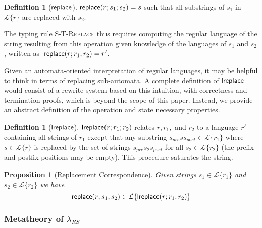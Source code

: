 \documentclass[10pt]{sigplanconf}
\newtheorem{prop}[thm]{Proposition}
\theoremstyle{definition}
\newtheorem{defn}[thm]{Definition}
\newcommand{\Lagr}{\mathcal{L}}
\newcommand{\lang}[1]{\Lagr\{#1\}}
\newcommand{\lambdas}{\lambda_{RS}}
\newcommand{\lsubst}[3]{{\sf replace}(#1;#2;#3)} %
\newcommand{\lreplace}[3]{{\sf lreplace}(#1; #2; #3)}
\begin{document}
\begin{defn}[$\sf{replace}$]
$\lsubst{r}{s_1}{s_2} = s$ such that all substrings of $s_1$ in $\lang{r}$ are replaced with $s_2$.
\end{defn}
The typing rule \textsc{S-T-Replace} thus requires computing the regular language of the string resulting from this operation given knowledge of the languages of $s_1$ and $s_2$, written as $\lreplace{r}{r_1}{r_2}={r'}$. 


Given an automata-oriented interpretation of regular languages, it may be helpful to think in terms of replacing sub-automata. A complete definition of ${\sf lreplace}$ would consist of a rewrite system based on this intuition, with correctness and termination proofs, which is beyond the scope of this paper. Instead, we provide an abstract definition of the operation and state necessary properties. 

\begin{defn}[$\sf{lreplace}$]
  $\lreplace{r}{r_1}{r_2}$ relates $r, r_1,$ and $r_2$ to
  a language $r'$ containing all strings of $r_1$ except that any substring $s_{pre} s s_{post} \in \lang{r_1}$ where $s \in \lang{r}$
  is replaced by the set of strings $s_{pre} s_2 s_{post}$ for all $s_2 \in \lang{r_2}$ (the prefix and postfix positions may be empty). This procedure saturates the string.
\end{defn}


\begin{prop}[Replacement Correspondence] \label{thm:substcorrespondence}
  Given strings $s_1 \in \lang{r_1}$ and $s_2 \in \lang{r_2}$ we have $$\lsubst{r}{s_1}{s_2} \in \lang{\lreplace{r}{r_1}{r_2}}$$
\end{prop}

\subsubsection{Metatheory of $\lambdas$}
\end{document}

